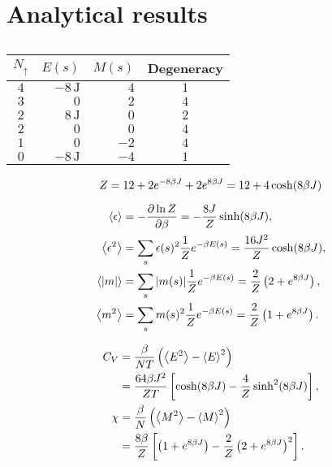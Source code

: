 \appendix 

\section{Analytical results}

\begin{table}[h!]
    \begin{tabular}{crrc}
    $N_\uparrow$ & $E(s)$ & $M(s)$ & Degeneracy \\ \hline
    $4$ & $-8\,\mathrm{J}$ & $4$ & $1$ \\
    $3$ & $0$ & $2$ & $4$ \\
    $2$ & $8\,\mathrm{J}$ & $0$ & $2$ \\
    $2$ & $0$ & $0$ & $4$ \\
    $1$ & $0$ & $-2$ & $4$ \\
    $0$ & $-8\,\mathrm{J}$ & $-4$ & $1$
    \end{tabular}
    \caption{}
    \label{tab:2d_configurations}
\end{table}

\begin{equation}\label{eq:analytical_partition_func}
    Z = 12 + 2 e^{-8\beta J} + 2 e^{8\beta J} = 12 + 4 \cosh(8\beta J)
\end{equation}

\begin{align}
    \expval{\epsilon} &= -\pdv{\ln Z}{\beta} = -\frac{8J}{Z}\sinh(8\beta J), \label{eq:analytical_avg_energy} \\ 
    \expval{\epsilon^2} &= \sum_s \epsilon(s)^2 \frac{1}{Z} e^{-\beta E(s)} = \frac{16 J^2}{Z}\cosh(8\beta J),\label{eq:analytical_avg_energy_squared} \\ 
    \expval{\abs{m}} &= \sum_s \abs{m(s)} \frac{1}{Z}e^{-\beta E(s)} = \frac{2}{Z}\left( 2 + e^{8\beta J} \right),\label{eq:analytical_avg_absolute_mag} \\ 
    \expval{m^2} &= \sum_s m(s)^2 \frac{1}{Z} e^{-\beta E(s)} = \frac{2}{Z}\left( 1 + e^{8\beta J} \right). \label{eq:analytical_avg_mag_squared}
\end{align}


\begin{align}
    C_V &= \frac{\beta}{N T}\left( \expval{E^2} - \expval{E}^2 \right) \nonumber \\ 
    &= \frac{64\beta J^2}{Z T} \left[ \cosh(8\beta J) - \frac{4}{Z}\sinh^2(8\beta J) \right], \label{eq:analytical_CV} \\ 
    \chi &= \frac{\beta}{N}\left( \expval{M^2} - \expval{M}^2 \right) \nonumber \\
    &= \frac{8\beta}{Z}\left[ \left( 1+e^{8\beta J} \right) - \frac{2}{Z}\left( 2+e^{8\beta J} \right)^2 \right]. \label{eq:analytical_magnetic_susceptibility}
\end{align}